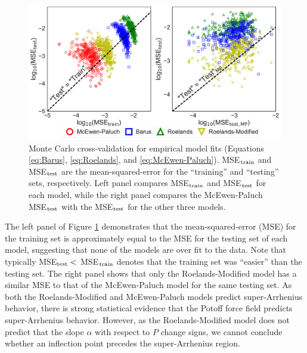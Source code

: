 \documentclass[preprint,review,12pt]{elsarticle}
\begin{document}
	\begin{figure}[htb!]
		\centering
		\includegraphics[width=6.4in]{cross_validation.pdf}
		\caption{Monte Carlo cross-validation for empirical model fits (Equations \ref{eq:Barus}, \ref{eq:Roelands}, and \ref{eq:McEwen-Paluch}). MSE$_{\rm train}$ and MSE$_{\rm test}$ are the mean-squared-error for the ``training'' and ``testing'' sets, respectively. Left panel compares MSE$_{\rm train}$ and MSE$_{\rm test}$ for each model, while the right panel compares the McEwen-Paluch MSE$_{\rm test}$ with the MSE$_{\rm test}$ for the other three models.}
		\label{fig:cross_validation}
	\end{figure}
	
	The left panel of Figure \ref{fig:cross_validation} demonstrates that the mean-squared-error (MSE) for the training set is approximately equal to the MSE for the testing set of each model, suggesting that none of the models are over fit to the data. Note that typically MSE$_{\rm test} < $ MSE$_{\rm train}$ denotes that the training set was ``easier'' than the testing set. The right panel shows that only the Roelands-Modified model has a similar MSE to that of the McEwen-Paluch model for the same testing set. As both the Roelands-Modified and McEwen-Paluch models predict super-Arrhenius behavior, there is strong statistical evidence that the Potoff force field predicts super-Arrhenius behavior. However, as the Roelands-Modified model does not predict that the slope $\alpha$ with respect to $P$ change signs, we cannot conclude whether an inflection point precedes the super-Arrhenius region.
	
	
	
\end{document}
